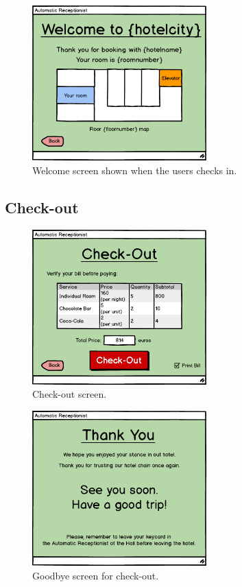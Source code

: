 \documentclass{article}
\begin{document}
\begin{figure}[H]
\centering
\includegraphics[width=0.6\textwidth]{Images/Basic_4_CheckIn_Done.png}
\caption{Welcome screen shown when the users checks in.}
\label{figCheckInDone}
\end{figure}

\subsection{Check-out}

\begin{figure}[H]
\centering
\includegraphics[width=0.6\textwidth]{Images/Both_6_Check-out.png}
\caption{Check-out screen.}
\label{figCheckOut}
\end{figure}


\begin{figure}[H]
\centering
\includegraphics[width=0.6\textwidth]{Images/Both_7_Goodbye.png}
\caption{Goodbye screen for check-out.}
\label{figGoodbye}
\end{figure}
\end{document}
